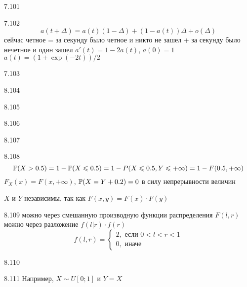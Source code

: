 \protect \hypertarget {soln:7.101}{}
\begin{solution}{{7.101}}
\end{solution}
\protect \hypertarget {soln:7.102}{}
\begin{solution}{{7.102}}
  \[ a(t+\Delta)=a(t)(1-\Delta)+(1-a(t))\Delta + o(\Delta) \]
  сейчас четное = за секунду было четное и никто не зашел + за секунду было нечетное и один зашел
  $a'(t)=1-2a(t)$, $a(0)=1$
  $a(t)=(1+\exp(-2t))/2$
\end{solution}
\protect \hypertarget {soln:7.103}{}
\begin{solution}{{7.103}}
\end{solution}
\protect \hypertarget {soln:8.104}{}
\begin{solution}{{8.104}}
\end{solution}
\protect \hypertarget {soln:8.105}{}
\begin{solution}{{8.105}}
\end{solution}
\protect \hypertarget {soln:8.106}{}
\begin{solution}{{8.106}}
\end{solution}
\protect \hypertarget {soln:8.107}{}
\begin{solution}{{8.107}}
\end{solution}
\protect \hypertarget {soln:8.108}{}
\begin{solution}{{8.108}}
  \[
  \P(X>0.5) = 1 - \P(X\leq 0.5) = 1 - P(X\leq 0.5, Y\leq +\infty) = 1 - F(0.5, +\infty)
  \]
  $F_X(x)=F(x, +\infty)$, $\P(X=Y+0.2)=0$ в силу непрерывности величин

  $X$ и $Y$ независимы, так как $F(x,y)=F(x)\cdot F(y)$
\end{solution}
\protect \hypertarget {soln:8.109}{}
\begin{solution}{{8.109}}
  можно через смешанную производную функции распределения $F(l,r)$
  можно через разложение $f(l|r)\cdot f(r)$
  \[
  f(l,r)=\begin{cases}
  2, \text{ если } 0<l<r<1 \\
  0, \text{ иначе }
  \end{cases}
  \]
\end{solution}
\protect \hypertarget {soln:8.110}{}
\begin{solution}{{8.110}}
\end{solution}
\protect \hypertarget {soln:8.111}{}
\begin{solution}{{8.111}}
  Например, $X\sim U[0;1]$ и $Y=X$
\end{solution}
\protect \hypertarget {soln:8.112}{}
